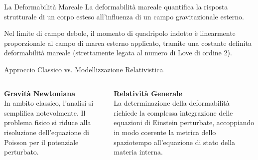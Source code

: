 \documentclass[8pt, aspectratio=169]{beamer}
\begin{document}
\begin{frame}{La Deformabilità Mareale}
La deformabilità mareale quantifica la risposta strutturale di un corpo esteso all'influenza di un campo gravitazionale esterno.

\bigskip
Nel limite di campo debole, il momento di quadripolo indotto è linearmente proporzionale al campo di marea esterno applicato, tramite una costante definita deformabilità mareale (strettamente legata al numero di Love di ordine 2).
\end{frame}

\begin{frame}{Approccio Classico vs. Modellizzazione Relativistica}
\begin{columns}[T,onlytextwidth]
\textbf{Gravità Newtoniana}\\[0.5em]
In ambito classico, l'analisi si semplifica notevolmente. Il problema fisico si riduce alla risoluzione dell'equazione di Poisson per il potenziale perturbato.

\textbf{Relatività Generale}\\[0.5em]
La determinazione della deformabilità richiede la complessa integrazione delle equazioni di Einstein perturbate, accoppiando in modo coerente la metrica dello spaziotempo all'equazione di stato della materia interna.
\end{columns}
\end{frame}
\end{document}
